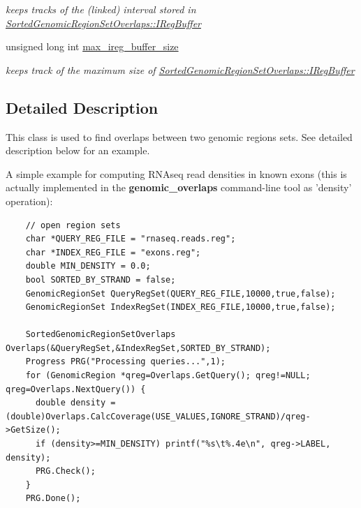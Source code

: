 \begin{CompactItemize}
\begin{CompactList}\small\item\em keeps tracks of the (linked) interval stored in \hyperlink{classSortedGenomicRegionSetOverlaps_19fa18e6abd9f045786698fff48a445f}{SortedGenomicRegionSetOverlaps::IRegBuffer} \item\end{CompactList}\item 
\hypertarget{classSortedGenomicRegionSetOverlaps_349d589ff006f742d635b16987fe7b6b}{
unsigned long int \hyperlink{classSortedGenomicRegionSetOverlaps_349d589ff006f742d635b16987fe7b6b}{max\_\-ireg\_\-buffer\_\-size}}
\label{classSortedGenomicRegionSetOverlaps_349d589ff006f742d635b16987fe7b6b}

\begin{CompactList}\small\item\em keeps track of the maximum size of \hyperlink{classSortedGenomicRegionSetOverlaps_19fa18e6abd9f045786698fff48a445f}{SortedGenomicRegionSetOverlaps::IRegBuffer} \item\end{CompactList}\end{CompactItemize}


\subsection{Detailed Description}
This class is used to find overlaps between two genomic regions sets. See detailed description below for an example. 

A simple example for computing RNAseq read densities in known exons (this is actually implemented in the {\bf genomic\_\-overlaps} command-line tool as 'density' operation): 

\begin{Code}\begin{verbatim}    // open region sets
    char *QUERY_REG_FILE = "rnaseq.reads.reg";
    char *INDEX_REG_FILE = "exons.reg";
    double MIN_DENSITY = 0.0;
    bool SORTED_BY_STRAND = false; 
    GenomicRegionSet QueryRegSet(QUERY_REG_FILE,10000,true,false);
    GenomicRegionSet IndexRegSet(INDEX_REG_FILE,10000,true,false);

    SortedGenomicRegionSetOverlaps Overlaps(&QueryRegSet,&IndexRegSet,SORTED_BY_STRAND);
    Progress PRG("Processing queries...",1);
    for (GenomicRegion *qreg=Overlaps.GetQuery(); qreg!=NULL; qreg=Overlaps.NextQuery()) {
      double density = (double)Overlaps.CalcCoverage(USE_VALUES,IGNORE_STRAND)/qreg->GetSize(); 
      if (density>=MIN_DENSITY) printf("%s\t%.4e\n", qreg->LABEL, density);
      PRG.Check();
    }
    PRG.Done();
\end{verbatim}
\end{Code}

